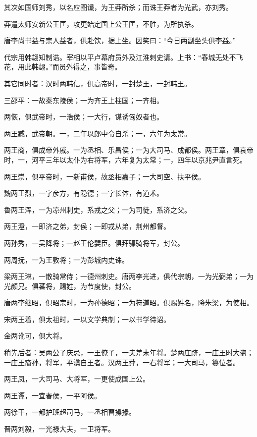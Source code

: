 \documentclass[a4paper,12pt,UTF8,twoside]{ctexbook}
\begin{document}
    其次如国师刘秀，以名应图谶，为王莽所杀；而诛王莽者为光武，亦刘秀。
    
    莽遣太师安新公王匡，攻更始定国上公王匡，不胜，为所执杀。
    
    唐李尚书益与宗人益者，俱赴饮，据上坐。因笑曰：“今日两副坐头俱李益。”
    
    代宗用韩翃知制诰。宰相以平卢幕府员外及江淮刺史请。上书：“春城无处不飞花，用此韩翃。”而员外得之，事皆奇。
    
    其它同时者：汉时两韩信，俱高帝时，一封楚王，一封韩王。
    
    三邵平：一故秦东陵侯；一为齐王上柱国；一齐相。
    
    两恢，俱武帝时，一浩侯；一大行，谋诱匈奴者也。
    
    两王臧，武帝朝。一，二年以郎中令自杀；一，六年为太常。
    
    两王商，俱成帝外戚。一为丞相、乐昌侯；一为大司马、成都侯。两王章，俱哀帝时，一，河平三年以太仆为右将军，六年复为太常；一，四年以京兆尹直言死。
    
    两王崇，俱平帝时，一新甫侯，故丞相嘉子；一大司空、扶平侯。
    
    魏两王烈，一字彦方，有隐德；一字长体，有道术。
    
    鲁两王浑，一为凉州刺史，系戎之父；一为司徒，系济之父。
    
    两王澄，一即济之弟，封侯；一即戎从弟，荆州都督。
    
    两孙秀，一吴降将；一赵王伦嬖臣。俱拜骠骑将军，封公。
    
    两周抚，一为王敦将；一为彭城内史诛。
    
    梁两王琳，一散骑常侍；一德州刺史。唐两李光进，俱代宗朝，一为光弼弟；一为光颜兄。俱蕃将，赐姓，为节度使，封公。
    
    唐两李继昭，俱昭宗时，一为孙德昭；一为符道昭。俱赐姓名，降朱梁，为使相。
    
    宋两王着，俱太祖时，一以文学典制；一以书学待诏。
    
    金两讹可，俱大将。
    
    稍先后者：吴两公子庆忌，一王僚子，一夫差末年将。楚两庄跻，一庄王时大盗；一庄王裔孙，将军，平滇自王者。汉两王莽，一右将军；一大司马，篡位者。
    
    两王凤，一大司马、大将军，一更使成国上公。
    
    两王谭，一宜春侯，一平阿侯。
    
    两徐干，一都护班超司马，一丞相曹操掾。
    
    晋两刘毅，一光禄大夫，一卫将军。
    
\end{document}
